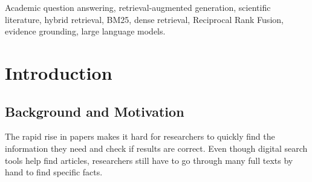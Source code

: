 \documentclass[conference]{IEEEtran}
\begin{document}
\begin{abstract}
The rapid rise of scientific literature makes it increasingly difficult for researchers to efficiently find, understand, and verify relevant information. Large Language Models can help answer questions in natural language but their answers sometimes include facts that are hard to verify. This paper introduces ScholarLens, a research assistant designed to give answers based on evidence from scientific papers.

ScholarLens uses a hybrid retrieval approach. It combines vector search, BM25 keyword search and Reciprocal Rank Fusion to find relevant evidence or passages. The system works with a collection of 1,000 research papers across five scientific domains. The papers are processed by extracting sections, filtering non-evidence content, and dividing the text into overlapping chunks. This helps preserve context during retrieval and supports more effective evidence selection.

Each piece of retrieved evidence is tracked using identifiers. These identifiers help the system trace each piece of evidence back to its source. This provenance is then used to guide a Large Language Model in generating answers that are supported by evidence. If the local collection does not provide sufficient information, ScholarLens uses the ArXiv API to retrieve additional academic evidence.

The system was evaluated through retrieval and question-answering experiments examining retrieval effectiveness, answer quality, and evidence grounding.

\end{abstract}

\begin{IEEEkeywords}
Academic question answering, retrieval-augmented generation, scientific literature, hybrid retrieval, BM25, dense retrieval, Reciprocal Rank Fusion, evidence grounding, large language models.
\end{IEEEkeywords}

\section{Introduction}

\subsection{Background and Motivation}

The rapid rise in papers makes it hard for researchers to quickly find the information they need and check if results are correct. Even though digital search tools help find articles, researchers still have to go through many full texts by hand to find specific facts.
\end{document}
